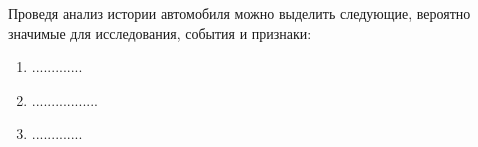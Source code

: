 		\pagebreak
		
		\noindent Проведя анализ истории автомобиля  можно выделить следующие, вероятно  значимые для исследования, события и признаки:
		\begin{enumerate}
			\item  .............
			\item .................
			\item .............
		\end{enumerate}
		
		
